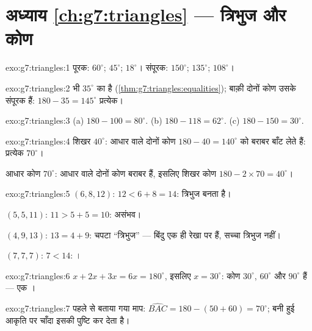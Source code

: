 \section*{अध्याय \ref{ch:g7:triangles} --- त्रिभुज और कोण}

\begin{solution}{exo:g7:triangles:1}
पूरक: $60^\circ$; $45^\circ$; $18^\circ$।
संपूरक: $150^\circ$; $135^\circ$; $108^\circ$।
\end{solution}

\begin{solution}{exo:g7:triangles:2}
 भी $35^\circ$ का है
(\cref{thm:g7:triangles:equalities}); बाक़ी दोनों कोण उसके संपूरक
हैं: $180 - 35 = 145^\circ$ प्रत्येक।
\end{solution}

\begin{solution}{exo:g7:triangles:3}
(a) $180 - 100 = 80^\circ$. \quad
(b) $180 - 118 = 62^\circ$. \quad
(c) $180 - 150 = 30^\circ$.
\end{solution}

\begin{solution}{exo:g7:triangles:4}
शिखर $40^\circ$: आधार वाले दोनों कोण $180 - 40 = 140^\circ$ को
बराबर बाँट लेते हैं: प्रत्येक $70^\circ$।

आधार कोण $70^\circ$: आधार वाले दोनों कोण बराबर हैं, इसलिए शिखर कोण
$180 - 2 \times 70 = 40^\circ$।
\end{solution}

\begin{solution}{exo:g7:triangles:5}
$(6, 8, 12)$: $12 < 6 + 8 = 14$: त्रिभुज बनता है।

$(5, 5, 11)$: $11 > 5 + 5 = 10$: असंभव।

$(4, 9, 13)$: $13 = 4 + 9$: चपटा ``त्रिभुज'' --- बिंदु एक ही रेखा
पर हैं, सच्चा त्रिभुज नहीं।

$(7, 7, 7)$: $7 < 14$: ।
\end{solution}

\begin{solution}{exo:g7:triangles:6}
$x + 2x + 3x = 6x = 180^\circ$, इसलिए $x = 30^\circ$: कोण
$30^\circ$, $60^\circ$ और $90^\circ$ हैं --- एक ।
\end{solution}

\begin{solution}{exo:g7:triangles:7}
पहले से बताया गया माप: $\widehat{BAC} = 180 - (50 + 60) = 70^\circ$;
बनी हुई आकृति पर चाँदा इसकी पुष्टि कर देता है।
\end{solution}


